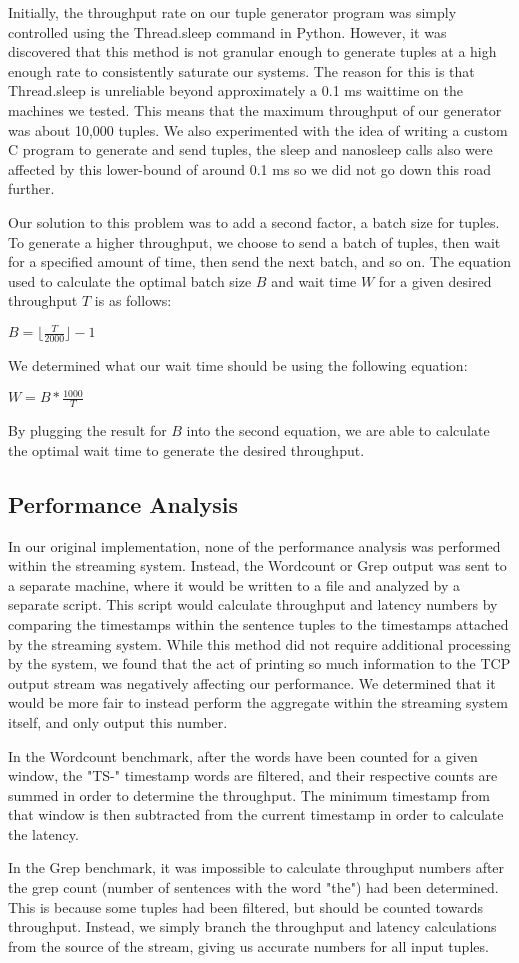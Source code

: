Initially, the throughput rate on our tuple generator program was simply controlled using the Thread.sleep command in Python.  However, it was discovered that this method is not granular enough to generate tuples at a high enough rate to consistently saturate our systems.  The reason for this is that Thread.sleep is unreliable beyond approximately a 0.1 ms waittime on the machines we tested.  This means that the maximum throughput of our generator was about 10,000 tuples. We also experimented with the idea of writing a custom C program to generate and send tuples, the sleep and nanosleep calls also were affected by this lower-bound of around 0.1 ms so we did not go down this road further.

Our solution to this problem was to add a second factor, a batch size for
tuples.  To generate a higher throughput, we choose to send a batch of tuples,
then wait for a specified amount of time, then send the next batch, and so on.
The equation used to calculate the optimal batch size $B$ and wait time $W$ for a given
desired throughput $T$ is as follows:

{\large $B = \lfloor\frac{T}{2000}\rfloor - 1$}

We determined what our wait time should be using the following equation:

{\large $W = B * \frac{1000}{T}$}

By plugging the result for $B$ into the second equation, we are able to
calculate the optimal wait time to generate the desired throughput.

\subsection{Performance Analysis}
In our original implementation, none of the performance analysis was performed within the streaming system.  Instead, the Wordcount or Grep output was sent to a separate machine, where it would be written to a file and analyzed by a separate script.  This script would calculate throughput and latency numbers by comparing the timestamps within the sentence tuples to the timestamps attached by the streaming system.  While this method did not require additional processing by the system, we found that the act of printing so much information to the TCP output stream was negatively affecting our performance.  We determined that it would be more fair to instead perform the aggregate within the streaming system itself, and only output this number.

In the Wordcount benchmark, after the words have been counted for a given window, the "TS-" timestamp words are filtered, and their respective counts are summed in order to determine the throughput.  The minimum timestamp from that window is then subtracted from the current timestamp in order to calculate the latency.

In the Grep benchmark, it was impossible to calculate throughput numbers after the grep count (number of sentences with the word "the") had been determined.  This is because some tuples had been filtered, but should be counted towards throughput.  Instead, we simply branch the throughput and latency calculations from the source of the stream, giving us accurate numbers for all input tuples.

